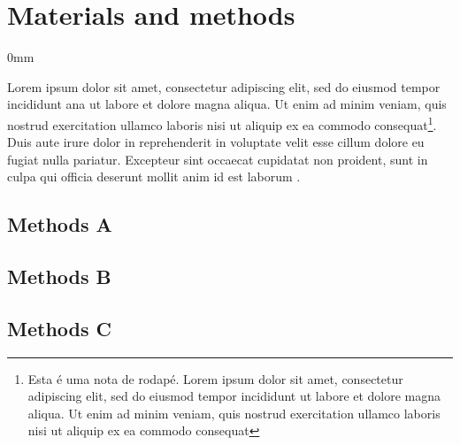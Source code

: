 \documentclass[./main.tex]{subfiles}
\begin{document}
\section{Materials and methods} \label{methods}

\begin{adjustwidth}{\bodytab}{0mm}

\par Lorem ipsum dolor sit amet, consectetur adipiscing elit, sed do eiusmod tempor incididunt \acrshort{ana} ut labore et dolore magna aliqua. Ut enim ad minim veniam, quis nostrud exercitation ullamco laboris nisi ut aliquip ex ea commodo consequat\footnote{Esta é uma nota de rodapé. Lorem ipsum dolor sit amet, consectetur adipiscing elit, sed do eiusmod tempor incididunt ut labore et dolore magna aliqua. Ut enim ad minim veniam, quis nostrud exercitation ullamco laboris nisi ut aliquip ex ea commodo consequat}. Duis aute irure dolor in reprehenderit in voluptate velit esse cillum dolore eu fugiat nulla pariatur. Excepteur sint occaecat cupidatat non proident, sunt in culpa qui officia deserunt mollit anim id est laborum \cite{Pearce2002a}.

\subsection{Methods A} \label{methods:a}





\subsection{Methods B} \label{methods:b}





\subsection{Methods C} \label{methods:c}





\end{adjustwidth}
\end{document}
